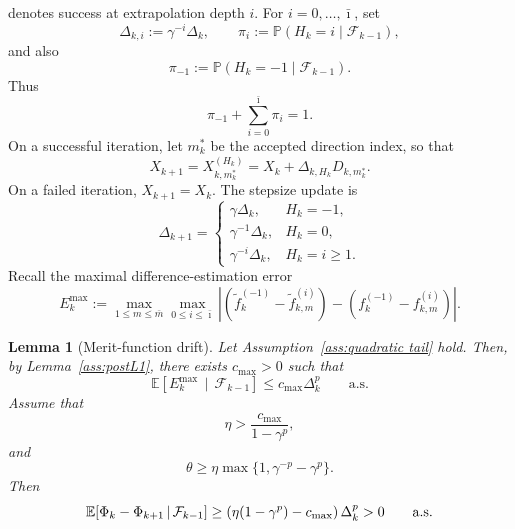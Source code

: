 \documentclass[11pt,a4paper]{article}
\newtheorem{lemma}{Lemma}[section]
\newcommand{\Imax}{\bar{\imath}}%
\newcommand{\Dexp}{p}
\begin{document}
denotes success at extrapolation depth \(i\). For \(i=0,\ldots,\Imax\), set
\[
    \Delta_{k,i}:=\gamma^{-i}\Delta_k,
    \qquad
    \pi_i:=\mathbb P(H_k=i\mid\mathcal F_{k-1}),
\]
and also
\[
    \pi_{-1}:=\mathbb P(H_k=-1\mid\mathcal F_{k-1}).
\]
Thus
\[
    \pi_{-1}+\sum_{i=0}^{\Imax}\pi_i=1.
\]
On a successful iteration, let \(m_k^*\) be the accepted direction index, so that
\[
    X_{k+1}
    =
    X_{k,m_k^*}^{(H_k)}
    =
    X_k+\Delta_{k,H_k}D_{k,m_k^*}.
\]
On a failed iteration, \(X_{k+1}=X_k\). The stepsize update is
\[
\Delta_{k+1}
=
\begin{cases}
    \gamma\Delta_k, & H_k=-1,\\[1mm]
    \gamma^{-1}\Delta_k, & H_k=0,\\[1mm]
    \gamma^{-i}\Delta_k, & H_k=i\ge1.
\end{cases}
\]
Recall the maximal difference-estimation error
\[
E_k^{\max}
:=
\max_{1\le m\le \bar{m}}
\max_{0\le i\le \Imax}
\left|
\left(
\tilde f_k^{(-1)}-\tilde f_{k,m}^{(i)}
\right)
-
\left(
f_k^{(-1)}-f_{k,m}^{(i)}
\right)
\right|.
\]

\begin{lemma}[Merit-function drift]
\label{lem:phi_drift_main}
Let Assumption~\ref{ass:quadratic tail} hold. Then, by
Lemma~\ref{ass:postL1}, there exists \(c_{\max}>0\) such that
\[
    \mathbb E\!\left[
        E_k^{\max}
        \,\middle|\,
        \mathcal F_{k-1}
    \right]
    \le
    c_{\max}\Delta_k^\Dexp
    \qquad \text{a.s.}
\]
Assume that
\begin{equation}
\label{ass:eta}
    \eta>
    \frac{c_{\max}}{1-\gamma^\Dexp},
\end{equation}
and
\begin{equation}
\label{ass:theta_eta_compatibility}
    \theta
    \ge
    \eta\max\{1,\gamma^{-\Dexp}-\gamma^\Dexp\}.
\end{equation}
Then
\begin{equation}
\label{eq:drift_uniform}
\mathbb E\!\left[
    \Phi_k-\Phi_{k+1}
    \,\middle|\,
    \mathcal F_{k-1}
\right]
\ge
\left(
    \eta(1-\gamma^\Dexp)-c_{\max}
\right)\Delta_k^\Dexp
>0
\qquad \textup{a.s.}
\end{equation}
\end{lemma}
\end{document}
